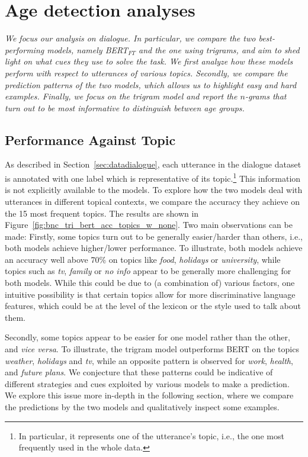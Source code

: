 \section{Age detection analyses}
\label{sec:exp1_analyses}
\textit{We focus our analysis on dialogue. In particular, we compare the two best-performing models, namely BERT$_{FT}$
and the one using trigrams, and aim to shed light on  what cues they use to solve the task.
We first analyze how these models perform with respect to utterances of various topics.
Secondly, we compare the prediction patterns of the two models, which allows us to highlight easy and hard examples.
Finally, we focus on the trigram model and report the $n$-grams that turn out to be most informative to distinguish between age groups.
}

\subsection{Performance Against Topic}

As described in Section~\ref{sec:datadialogue}, each utterance in the dialogue dataset is annotated with one label which is representative of its topic.\footnote{In particular, it represents one of the utterance's topic, i.e., the one most frequently used in the whole data.} This information is not explicitly available to the models.
To explore how the two models deal with utterances in different topical contexts, we compare the accuracy they achieve on the 15 most frequent topics. The results are shown in Figure~\ref{fig:bnc_tri_bert_acc_topics_w_none}. Two main observations can be made: Firstly, some topics turn out to be generally easier/harder than others, i.e., both models achieve higher/lower performance. To illustrate, both models achieve an accuracy well above 70\% on topics like \emph{food}, \emph{holidays} or \emph{university}, while topics such as \emph{tv}, \emph{family} or \emph{no info} appear to be generally more challenging for both models. While this could be due to (a combination of) various factors, one intuitive possibility is that certain topics allow for more discriminative language features, which could be at the level of the lexicon or the style used to talk about them.

Secondly, some topics appear to be easier for one model rather than the other, and \emph{vice versa}. To illustrate, the trigram model outperforms BERT on the topics \emph{weather}, \emph{holidays} and \emph{tv}, while an opposite pattern is observed for \emph{work}, \emph{health}, and \emph{future plans}. We conjecture that these patterns could be indicative of different strategies and cues exploited by various models to make a prediction. We explore this issue more in-depth in the following section, where we compare the predictions by the two models and qualitatively inspect some examples.

